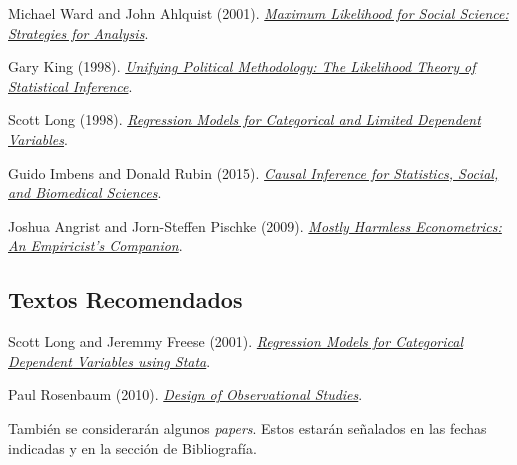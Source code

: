 \documentclass[letterpaper]{article}
\renewenvironment{itemize}{
  \begin{list}{}{
    \setlength{\leftmargin}{1.5em}
  }
}{
  \end{list}
}
\begin{document}
\begin{itemize}
  \item[$\bullet$] Michael Ward and John Ahlquist (2001). \href{https://github.com/hbahamonde/MLE/raw/master/Readings/Ward_Ahlquist.pdf}{\emph{Maximum Likelihood for Social Science: Strategies for Analysis}}.
  \item[$\bullet$] Gary King (1998). \href{https://github.com/hbahamonde/MLE/raw/master/Readings/King.pdf}{\emph{Unifying Political Methodology: The Likelihood Theory of Statistical Inference}}.
  \item[$\bullet$] Scott Long (1998). \href{https://github.com/hbahamonde/MLE/raw/master/Readings/Long.pdf}{\emph{Regression Models for Categorical and Limited Dependent Variables}}.
  \item[$\bullet$] Guido Imbens and Donald Rubin (2015). \href{https://github.com/hbahamonde/MLE/raw/master/Readings/Imbens_Rubin.pdf}{\emph{Causal Inference for Statistics, Social, and Biomedical Sciences}}.
  \item[$\bullet$] Joshua Angrist and Jorn-Steffen Pischke (2009). \href{https://github.com/hbahamonde/MLE/raw/master/Readings/MHE.pdf}{\emph{Mostly Harmless Econometrics: An Empiricist's Companion}}.

\end{itemize}

\subsection*{Textos Recomendados}

\begin{itemize}
	\item[$\bullet$] Scott Long and Jeremmy Freese (2001). \href{https://github.com/hbahamonde/MLE/raw/master/Readings/Long_Freese_STATA.pdf}{\emph{Regression Models for Categorical Dependent Variables using Stata}}.
	\item[$\bullet$] Paul Rosenbaum (2010). \href{https://github.com/hbahamonde/MLE/raw/master/Readings/Rosenbaum.pdf}{\emph{Design of Observational Studies}}.
\end{itemize}


\begin{itemize}
\item[{\color{red}\Pointinghand}] Tambi\'en se considerar\'an algunos \emph{papers}. Estos estar\'an se\~nalados en las fechas indicadas y en la secci\'on de Bibliograf\'ia.
\end{itemize}
\end{document}
